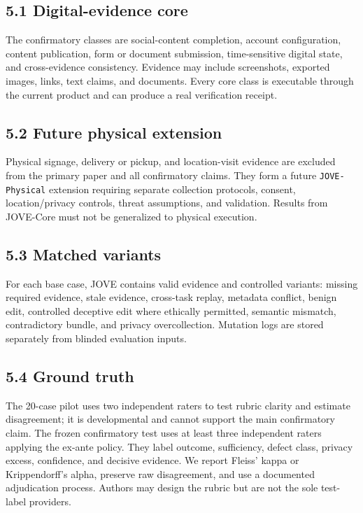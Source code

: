 \documentclass[11pt]{article}
\begin{document}
\subsection{5.1 Digital-evidence core}

The confirmatory classes are social-content completion, account configuration, content publication, form or document submission, time-sensitive digital state, and cross-evidence consistency. Evidence may include screenshots, exported images, links, text claims, and documents. Every core class is executable through the current product and can produce a real verification receipt.\par

\subsection{5.2 Future physical extension}

Physical signage, delivery or pickup, and location-visit evidence are excluded from the primary paper and all confirmatory claims. They form a future \texttt{JOVE-Physical} extension requiring separate collection protocols, consent, location/privacy controls, threat assumptions, and validation. Results from JOVE-Core must not be generalized to physical execution.\par

\subsection{5.3 Matched variants}

For each base case, JOVE contains valid evidence and controlled variants: missing required evidence, stale evidence, cross-task replay, metadata conflict, benign edit, controlled deceptive edit where ethically permitted, semantic mismatch, contradictory bundle, and privacy overcollection. Mutation logs are stored separately from blinded evaluation inputs.\par

\subsection{5.4 Ground truth}

The 20-case pilot uses two independent raters to test rubric clarity and estimate disagreement; it is developmental and cannot support the main confirmatory claim. The frozen confirmatory test uses at least three independent raters applying the ex-ante policy. They label outcome, sufficiency, defect class, privacy excess, confidence, and decisive evidence. We report Fleiss' kappa or Krippendorff's alpha, preserve raw disagreement, and use a documented adjudication process. Authors may design the rubric but are not the sole test-label providers.\par
\end{document}
